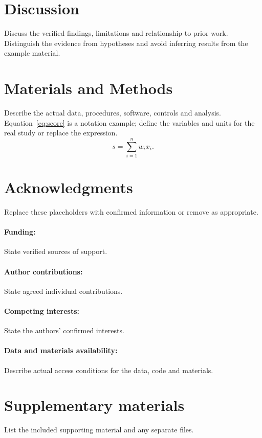 \documentclass[12pt]{article}
\begin{document}
\section*{Discussion}
Discuss the verified findings, limitations and relationship to prior work.
Distinguish the evidence from hypotheses and avoid inferring results from the
example material.

\section*{Materials and Methods}
Describe the actual data, procedures, software, controls and analysis.
Equation~\ref{eq:score} is a notation example; define the variables and units
for the real study or replace the expression.
\begin{equation}
s=\sum_{i=1}^{n} w_i x_i.
\label{eq:score}
\end{equation}

\clearpage



\section*{Acknowledgments}
Replace these placeholders with confirmed information or remove as appropriate.
\paragraph{Funding:} State verified sources of support.
\paragraph{Author contributions:} State agreed individual contributions.
\paragraph{Competing interests:} State the authors' confirmed interests.
\paragraph{Data and materials availability:} Describe actual access conditions
for the data, code and materials.

\section*{Supplementary materials}
List the included supporting material and any separate files.
\end{document}
